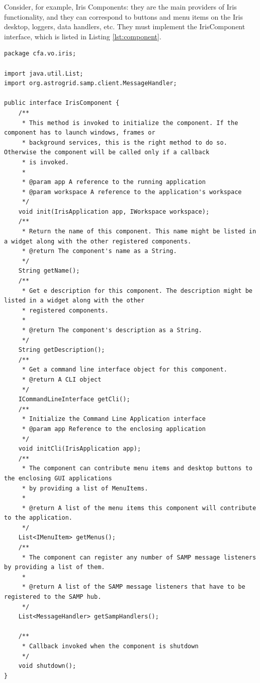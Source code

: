 \documentclass[5p]{elsarticle}
\begin{document}
Consider, for example, Iris Components: they are the main providers of Iris functionality, and they can correspond to buttons and menu items on the Iris desktop, loggers, data handlers, etc. They must implement the IrisComponent interface, which is listed in Listing \ref{lst:component}.


\begin{lstlisting}[style=java,
	caption={This snippet of code represents the main interface that all components in Iris have to implement, and how dependencies get injected into the components at runtime.},
	label=lst:component]
package cfa.vo.iris;

import java.util.List;
import org.astrogrid.samp.client.MessageHandler;

public interface IrisComponent {
    /**
     * This method is invoked to initialize the component. If the component has to launch windows, frames or
     * background services, this is the right method to do so. Otherwise the component will be called only if a callback
     * is invoked.
     *
     * @param app A reference to the running application
     * @param workspace A reference to the application's workspace
     */
    void init(IrisApplication app, IWorkspace workspace);
    /**
     * Return the name of this component. This name might be listed in a widget along with the other registered components.
     * @return The component's name as a String.
     */
    String getName();
    /**
     * Get e description for this component. The description might be listed in a widget along with the other
     * registered components.
     *
     * @return The component's description as a String.
     */
    String getDescription();
    /**
     * Get a command line interface object for this component.
     * @return A CLI object
     */
    ICommandLineInterface getCli();
    /**
     * Initialize the Command Line Application interface
     * @param app Reference to the enclosing application
     */
    void initCli(IrisApplication app);
    /**
     * The component can contribute menu items and desktop buttons to the enclosing GUI applications
     * by providing a list of MenuItems.
     *
     * @return A list of the menu items this component will contribute to the application.
     */
    List<IMenuItem> getMenus();
    /**
     * The component can register any number of SAMP message listeners by providing a list of them.
     *
     * @return A list of the SAMP message listeners that have to be registered to the SAMP hub.
     */
    List<MessageHandler> getSampHandlers();

    /**
     * Callback invoked when the component is shutdown
     */
    void shutdown();
}
\end{lstlisting}
\end{document}

